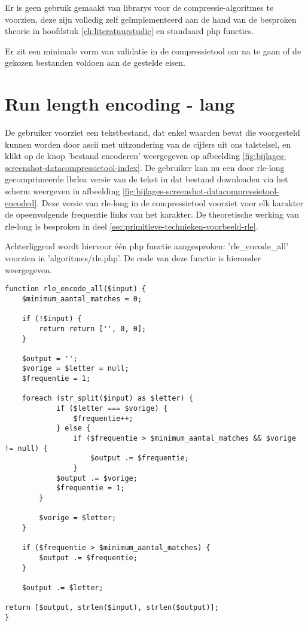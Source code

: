 Er is geen gebruik gemaakt van \glspl{library} voor de \glspl{compressie-algoritme} te voorzien, deze zijn volledig zelf geïmplementeerd aan de hand van de besproken theorie in hoofdstuk \ref{ch:literatuurstudie} en standaard \gls{php} functies.

Er zit een minimale vorm van validatie in de \gls{compressietool} om na te gaan of de gekozen bestanden voldoen aan de gestelde eisen.

\section{Run length encoding - lang}
\label{sec:compressietool-rlea}

De gebruiker voorziet een tekstbestand, dat enkel waarden bevat die voorgesteld kunnen worden door \gls{ascii} met uitzondering van de cijfers uit ons talstelsel, en klikt op de knop 'bestand encoderen' weergegeven op afbeelding \ref{fig:bijlages-screenshot-datacompressietool-index}. De gebruiker kan nu een door \gls{rle-long} gecomprimeerde \gls{lbrlea} versie van de tekst in dat bestand downloaden via het scherm weergeven in afbeelding \ref{fig:bijlages-screenshot-datacompressietool-encoded}. Deze versie van \gls{rle-long} in de \gls{compressietool} voorziet voor elk karakter de opeenvolgende frequentie links van het karakter. De theoretische werking van \gls{rle-long} is besproken in deel \ref{sec:primitieve-technieken-voorbeeld-rle}.

Achterliggend wordt hiervoor één \gls{php} functie aangesproken: 'rle\_encode\_all' voorzien in 'algoritmes/rle.php'. De code van deze functie is hieronder weergegeven.

\begin{lstlisting}
function rle_encode_all($input) {
	$minimum_aantal_matches = 0;
	
	if (!$input) {
		return return ['', 0, 0];
	}
	
	$output = '';
	$vorige = $letter = null;
	$frequentie = 1;
	
	foreach (str_split($input) as $letter) {
			if ($letter === $vorige) {
				$frequentie++;
			} else {
				if ($frequentie > $minimum_aantal_matches && $vorige != null) {
					$output .= $frequentie;
				}
			$output .= $vorige;
			$frequentie = 1;
		}
		
		$vorige = $letter;
	}
	
	if ($frequentie > $minimum_aantal_matches) {
		$output .= $frequentie;
	}
	
	$output .= $letter;

return [$output, strlen($input), strlen($output)];
}
\end{lstlisting}

